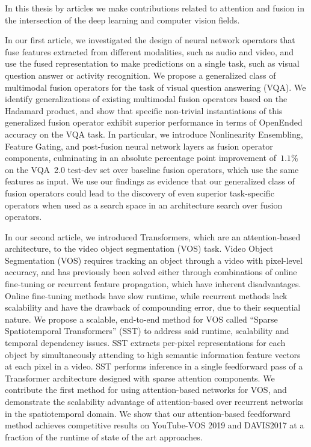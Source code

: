 In this thesis by articles we make contributions related to attention and
fusion in the intersection of the deep learning and computer vision fields.

In our first article, we investigated the design of neural network operators
that fuse features extracted from different modalities, such as audio and
video, and use the fused representation to make predictions on a single task,
such as visual question answer or activity recognition.
We propose a generalized class of multimodal fusion operators for the task of
visual question answering (VQA).
We identify generalizations of existing multimodal fusion operators based on
the Hadamard product, and show that specific non-trivial instantiations of this
generalized fusion operator exhibit superior performance in terms of OpenEnded
accuracy on the VQA task.
In particular, we introduce Nonlinearity Ensembling, Feature Gating, and
post-fusion neural network layers as fusion operator components, culminating in
an absolute percentage point improvement of~$1.1\%$ on the VQA~2.0 test-dev set
over baseline fusion operators, which use the same features as input.
We use our findings as evidence that our generalized class of fusion operators
could lead to the discovery of even superior task-specific operators when used
as a search space in an architecture search over fusion operators.

In our second article, we introduced Transformers, which are an attention-based
architecture, to the video object segmentation (VOS) task.
Video Object Segmentation (VOS) requires tracking an object through a video
with pixel-level accuracy, and has previously been solved either through
combinations of online fine-tuning or recurrent feature propagation, which have
inherent disadvantages.
Online fine-tuning methods have slow runtime, while recurrent methods lack
scalability and have the drawback of compounding error, due to their sequential
nature.
We propose a scalable, end-to-end method for VOS called
``Sparse Spatiotemporal Transformers'' (SST) to address said runtime,
scalability and temporal dependency issues.
SST extracts per-pixel representations for each object by simultaneously
attending to high semantic information feature vectors at each pixel in a
video.
SST performs inference in a single feedforward pass of a Transformer
architecture designed with sparse attention components.
We contribute the first method for using attention-based networks for VOS, and
demonstrate the scalability advantage of attention-based over recurrent
networks in the spatiotemporal domain.
We show that our attention-based feedforward method achieves competitive
results on YouTube-VOS 2019 and DAVIS2017 at a fraction of the runtime of state
of the art approaches.

